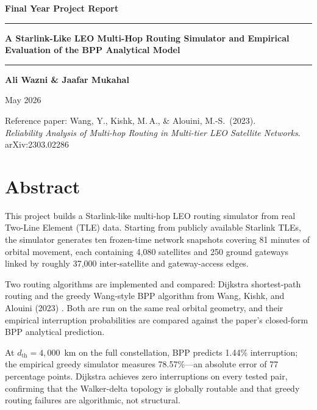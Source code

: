 \documentclass[12pt,a4paper]{report}
\newcommand{\dth}{d_{\mathrm{th}}}
\begin{document}
\begin{titlepage}
  \centering
  \vspace*{2cm}
  {\Large\bfseries Final Year Project Report\par}
  \vspace{0.5cm}
  \rule{\linewidth}{1pt}
  \vspace{0.4cm}
  {\LARGE\bfseries
A Starlink-Like LEO Multi-Hop Routing Simulator and Empirical Evaluation of the BPP Analytical Model
  \par}
  \vspace{0.4cm}
  \rule{\linewidth}{1pt}
  \vspace{2cm}
  {\large\bfseries Ali Wazni \quad \& \quad Jaafar Mukahal\par}
  \vspace{0.5cm}
  {\large May 2026\par}
  \vfill
  {\small
    Reference paper: Wang, Y., Kishk, M.\,A., \& Alouini, M.-S.\ (2023).\\
    \textit{Reliability Analysis of Multi-hop Routing in Multi-tier LEO Satellite Networks}.\\
    arXiv:2303.02286
  }
\end{titlepage}

\chapter*{Abstract}

This project builds a Starlink-like multi-hop LEO routing simulator from real
Two-Line Element (TLE) data. Starting from publicly available Starlink TLEs, the
simulator generates ten frozen-time network snapshots covering 81 minutes of orbital
movement, each containing 4{,}080 satellites and 250 ground gateways linked by roughly
37{,}000 inter-satellite and gateway-access edges.

Two routing algorithms are implemented and compared: Dijkstra shortest-path routing
and the greedy Wang-style BPP algorithm from Wang, Kishk, and Alouini (2023)
\cite{wang2023reliability}. Both are run on the same real orbital geometry, and their
empirical interruption probabilities are compared against the paper's closed-form BPP
analytical prediction.

At $\dth = 4{,}000$~km on the full constellation, BPP predicts 1.44\% interruption;
the empirical greedy simulator measures 78.57\%---an absolute error of 77 percentage
points. Dijkstra achieves zero interruptions on every tested pair, confirming that
the Walker-delta topology is globally routable and that greedy routing failures are
algorithmic, not structural.
\end{document}
